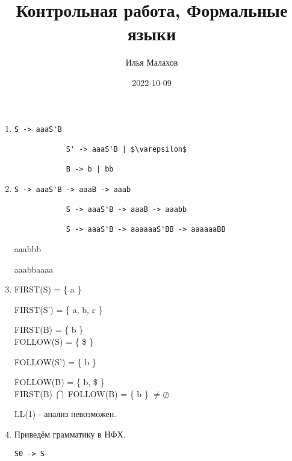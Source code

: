 \documentclass[12pt]{article}
\title{Контрольная работа, Формальные языки}
\author{Илья Малахов}
\date{2022-10-09}
\begin{document}
	
	\maketitle 
    \newpage

	\begin{enumerate}

        \item %

            \begin{lstlisting}[language=Lambda]
            S -> aaaS'B

            S' -> aaaS'B | $\varepsilon$

            B -> b | bb
            \end{lstlisting}

            
        \item %

            \begin{lstlisting}[language=Lambda]
            S -> aaaS'B -> aaaB -> aaab

            S -> aaaS'B -> aaaB -> aaabb

            S -> aaaS'B -> aaaaaaS'BB -> aaaaaaBB
            \end{lstlisting}

            aaabbb

            aaabbaaaa

        \item %

            FIRST(S) = \{ a \}

            FIRST(S') = \{ a, b, $\varepsilon$ \}

            FIRST(B) = \{ b \}
            \\

            FOLLOW(S) = \{ \$ \}

            FOLLOW(S') = \{ b \}

            FOLLOW(B) = \{ b, \$ \}
            \\

            FIRST(B) $\bigcap$ FOLLOW(B) = \{ b \} $\neq \oslash$ 

            LL(1) - анализ невозможен.

        \item %

            Приведём грамматику в НФХ.

            \begin{lstlisting}[language=Lambda]
            S0 -> S


\end{lstlisting}
\end{enumerate}
\end{document}

